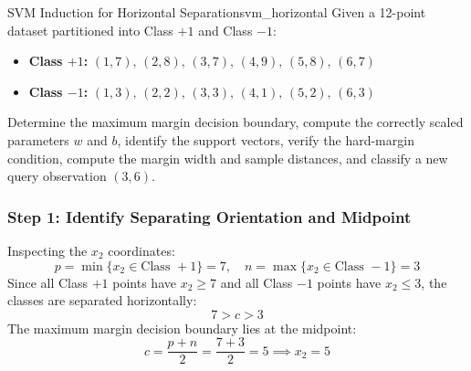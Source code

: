 \begin{example}{SVM Induction for Horizontal Separation}{svm_horizontal}
Given a 12-point dataset partitioned into Class $+1$ and Class $-1$:
\begin{itemize}
    \item \textbf{Class $+1$:} $(1, 7),\, (2, 8),\, (3, 7),\, (4, 9),\, (5, 8),\, (6, 7)$
    \item \textbf{Class $-1$:} $(1, 3),\, (2, 2),\, (3, 3),\, (4, 1),\, (5, 2),\, (6, 3)$
\end{itemize}
Determine the maximum margin decision boundary, compute the correctly scaled parameters $w$ and $b$, identify the support vectors, verify the hard-margin condition, compute the margin width and sample distances, and classify a new query observation $(3, 6)$.

\subsubsection{Step 1: Identify Separating Orientation and Midpoint}
Inspecting the $x_2$ coordinates:
\begin{equation}
p = \min\{x_2 \in \text{Class } +1\} = 7, \quad n = \max\{x_2 \in \text{Class } -1\} = 3
\end{equation}
Since all Class $+1$ points have $x_2 \ge 7$ and all Class $-1$ points have $x_2 \le 3$, the classes are separated horizontally:
\begin{equation}
7 > c > 3
\end{equation}
The maximum margin decision boundary lies at the midpoint:
\begin{equation}
c = \frac{p + n}{2} = \frac{7 + 3}{2} = 5 \implies x_2 = 5
\end{equation}


\end{example}
